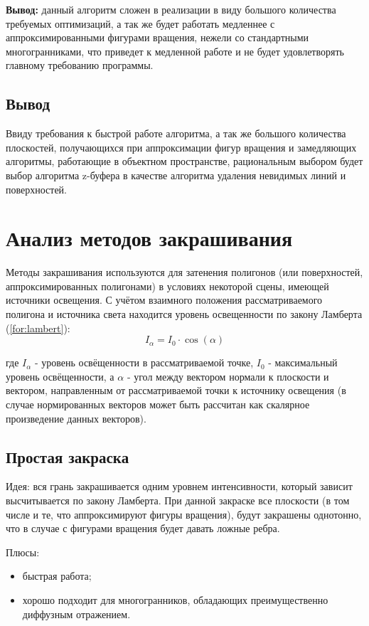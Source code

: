 \textbf{Вывод:} данный алгоритм сложен в реализации в виду большого количества требуемых оптимизаций, а так же будет работать медленнее с аппроксимированными фигурами вращения, нежели со стандартными многогранниками, что приведет к медленной работе и не будет удовлетворять главному требованию программы.

\subsection*{Вывод}
Ввиду требования к быстрой работе алгоритма, а так же большого количества плоскостей, получающихся при аппроксимации фигур вращения и замедляющих алгоритмы, работающие в объектном пространстве, рациональным выбором будет выбор алгоритма z-буфера в качестве алгоритма удаления невидимых линий и поверхностей.


\section{Анализ методов закрашивания}

Методы закрашивания используются для затенения полигонов (или поверхностей, аппроксимированных полигонами) в условиях некоторой сцены, имеющей источники освещения. С учётом взаимного положения рассматриваемого полигона и источника света находится уровень освещенности по закону Ламберта (\ref{for:lambert}):
\begin{equation}
    \label{for:lambert}
    I_{\alpha} = I_0 \cdot \cos{(\alpha)}
\end{equation}

где $I_{\alpha}$ - уровень освёщенности в рассматриваемой точке, $I_0$ - максимальный уровень освёщенности, а $\alpha$ - угол между вектором нормали к плоскости и вектором, направленным от рассматриваемой точки к источнику освещения (в случае нормированных векторов может быть рассчитан как скалярное произведение данных векторов).

\subsection{Простая закраска}

Идея: вся грань закрашивается одним уровнем интенсивности, который зависит высчитывается по закону Ламберта. При данной закраске все плоскости (в том числе и те, что аппроксимируют фигуры вращения), будут закрашены однотонно, что в случае с фигурами вращения будет давать ложные ребра.

Плюсы:
\begin{itemize}
    \item быстрая работа;
    \item хорошо подходит для многогранников, обладающих преимущественно диффузным отражением.
\end{itemize}

